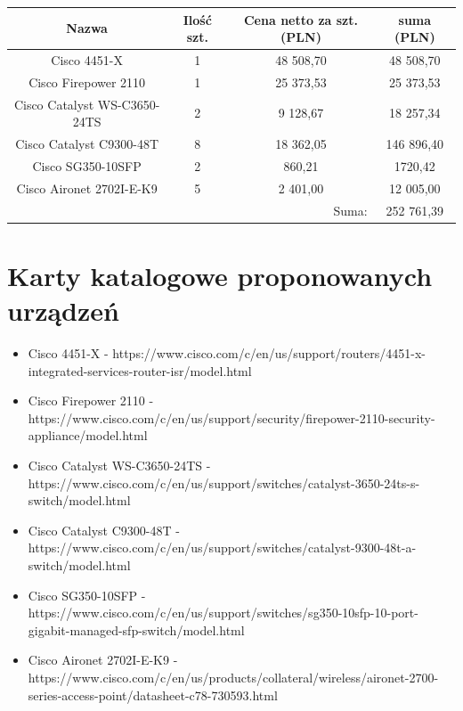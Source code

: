 \documentclass[12pt,a4paper]{article}
\begin{document}
	\begin{table}[H]
		\centering
		\begin{tabular}{c|c|c|c}
			Nazwa&Ilość szt.&Cena netto za szt. (PLN)&suma (PLN)\\\hline
			Cisco 4451-X&1&48 508,70&48 508,70\\
			Cisco Firepower 2110&1&25 373,53&25 373,53\\
			Cisco Catalyst WS-C3650-24TS&2&9 128,67&18 257,34\\
			Cisco Catalyst C9300-48T&8&18 362,05&146 896,40\\
			Cisco SG350-10SFP&2&860,21&1720,42\\
			Cisco Aironet 2702I-E-K9&5&2 401,00&12 005,00\\\hline
			\multicolumn{3}{r|}{Suma:}&252 761,39
		\end{tabular}
	\end{table}

	\section{Karty katalogowe proponowanych urządzeń}
	
	\begin{itemize}
		\item Cisco 4451-X - https://www.cisco.com/c/en/us/support/routers/4451-x-integrated-services-router-isr/model.html
		\item Cisco Firepower 2110 - https://www.cisco.com/c/en/us/support/security/firepower-2110-security-appliance/model.html
		\item Cisco Catalyst WS-C3650-24TS - https://www.cisco.com/c/en/us/support/switches/catalyst-3650-24ts-s-switch/model.html
		\item Cisco Catalyst C9300-48T - https://www.cisco.com/c/en/us/support/switches/catalyst-9300-48t-a-switch/model.html
		\item Cisco SG350-10SFP - https://www.cisco.com/c/en/us/support/switches/sg350-10sfp-10-port-gigabit-managed-sfp-switch/model.html
		\item Cisco Aironet 2702I-E-K9 - https://www.cisco.com/c/en/us/products/collateral/wireless/aironet-2700-series-access-point/datasheet-c78-730593.html
	\end{itemize}
	
\end{document}
